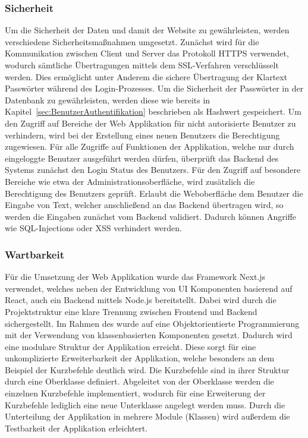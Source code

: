 \subsubsection{Sicherheit}
Um die Sicherheit der Daten und damit der Website zu gewährleisten, werden verschiedene Sicherheitsmaßnahmen umgesetzt.
Zunächst wird für die Kommunikation zwischen Client und Server das Protokoll \ac{HTTPS} verwendet, wodurch sämtliche Übertragungen mittels dem \ac{SSL}-Verfahren verschlüsselt werden.
Dies ermöglicht unter Anderem die sichere Übertragung der Klartext Passwörter während des Login-Prozesses.
Um die Sicherheit der Passwörter in der Datenbank zu gewährleisten, werden diese wie bereits in Kapitel~\ref{sec:BenutzerAuthentifikation} beschrieben als Hashwert gespeichert.
\newparagraph
Um den Zugriff auf Bereiche der Web Applikation für nicht autorisierte Benutzer zu verhindern, wird bei der Erstellung eines neuen Benutzers die Berechtigung  zugewiesen.
Für alle Zugriffe auf Funktionen der Applikation, welche nur durch eingeloggte Benutzer ausgeführt werden dürfen, überprüft das Backend des Systems zunächst den Login Status des Benutzers.
Für den Zugriff auf besondere Bereiche wie etwa der Administrationsoberfläche, wird zusätzlich die Berechtigung des Benutzers geprüft.
\newparagraph
Erlaubt die Weboberfläche dem Benutzer die Eingabe von Text, welcher anschließend an das Backend übertragen wird, so werden die Eingaben zunächst vom Backend validiert.
Dadurch können Angriffe wie \ac{SQL}-Injections oder \ac{XSS} verhindert werden.

\subsubsection{Wartbarkeit}
Für die Umsetzung der Web Applikation wurde das Framework Next.js verwendet, welches neben der Entwicklung von UI Komponenten basierend auf React, auch ein Backend mittels Node.js bereitstellt.
Dabei wird durch die Projektstruktur eine klare Trennung zwischen Frontend und Backend sichergestellt.
\newparagraph
Im Rahmen des  wurde auf eine Objektorientierte Programmierung mit der Verwendung von klassenbasierten Komponenten gesetzt.
Dadurch wird eine modulare Struktur der Applikation erreicht.
Diese sorgt für eine unkomplizierte Erweiterbarkeit der Applikation, welche besonders an dem Beispiel der Kurzbefehle deutlich wird.
Die Kurzbefehle sind in ihrer Struktur durch eine Oberklasse definiert.
Abgeleitet von der Oberklasse werden die einzelnen Kurzbefehle implementiert, wodurch für eine Erweiterung der Kurzbefehle lediglich eine neue Unterklasse angelegt werden muss.
\newparagraph
Durch die Unterteilung der Applikation in mehrere Module (Klassen) wird außerdem die Testbarkeit der Applikation erleichtert.

